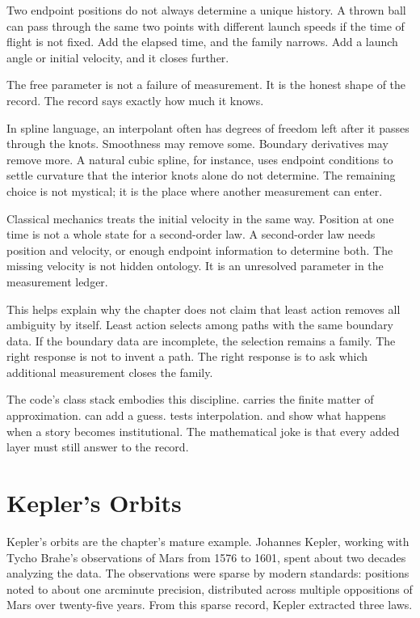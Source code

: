 Two endpoint positions do not always determine a unique history. A thrown ball
can pass through the same two points with different launch speeds if the time
of flight is not fixed. Add the elapsed time, and the family narrows. Add a
launch angle or initial velocity, and it closes further.

The free parameter is not a failure of measurement. It is the honest shape of
the record. The record says exactly how much it knows.

In spline language, an interpolant often has degrees of freedom left after it
passes through the knots. Smoothness may remove some. Boundary derivatives may
remove more. A natural cubic spline, for instance, uses endpoint conditions to
settle curvature that the interior knots alone do not determine. The remaining
choice is not mystical; it is the place where another measurement can enter.

Classical mechanics treats the initial velocity in the same way. Position at
one time is not a whole state for a second-order law. A second-order law needs
position and velocity, or enough endpoint information to determine both. The
missing velocity is not hidden ontology. It is an unresolved parameter in the
measurement ledger.

This helps explain why the chapter does not claim that least action removes all
ambiguity by itself. Least action selects among paths with the same boundary
data. If the boundary data are incomplete, the selection remains a family. The
right response is not to invent a path. The right response is to ask which
additional measurement closes the family.

The code's class stack embodies this discipline.  carries
the finite matter of approximation.  can add a guess.
 tests interpolation.  and  show
what happens when a story becomes institutional. The mathematical joke is that
every added layer must still answer to the record.

\section{Kepler's Orbits}
\label{se:keplers-orbits}

Kepler's orbits are the chapter's mature example. Johannes Kepler, working
with Tycho Brahe's observations of Mars from 1576 to 1601, spent about
two decades analyzing the data. The observations were sparse by modern
standards: positions noted to about one arcminute precision, distributed
across multiple oppositions of Mars over twenty-five years. From this
sparse record, Kepler extracted three laws.

